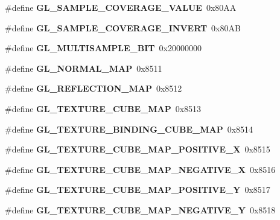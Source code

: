 \begin{DoxyCompactItemize}
\item 
\#define {\bfseries G\+L\+\_\+\+S\+A\+M\+P\+L\+E\+\_\+\+C\+O\+V\+E\+R\+A\+G\+E\+\_\+\+V\+A\+L\+U\+E}~0x80\+A\+A\label{_s_d_l__opengl_8h_a0ec2d62f355f2dc750d1977345938b33}

\item 
\#define {\bfseries G\+L\+\_\+\+S\+A\+M\+P\+L\+E\+\_\+\+C\+O\+V\+E\+R\+A\+G\+E\+\_\+\+I\+N\+V\+E\+R\+T}~0x80\+A\+B\label{_s_d_l__opengl_8h_a493a344af6533267a8be2b58a23130fa}

\item 
\#define {\bfseries G\+L\+\_\+\+M\+U\+L\+T\+I\+S\+A\+M\+P\+L\+E\+\_\+\+B\+I\+T}~0x20000000\label{_s_d_l__opengl_8h_a0b551148113ae3e7f81e5e9276be21ff}

\item 
\#define {\bfseries G\+L\+\_\+\+N\+O\+R\+M\+A\+L\+\_\+\+M\+A\+P}~0x8511\label{_s_d_l__opengl_8h_ac85ab960342ae6bd06881aabf31899d5}

\item 
\#define {\bfseries G\+L\+\_\+\+R\+E\+F\+L\+E\+C\+T\+I\+O\+N\+\_\+\+M\+A\+P}~0x8512\label{_s_d_l__opengl_8h_a26f8fe65ab3dc613b54b38220c54ac5e}

\item 
\#define {\bfseries G\+L\+\_\+\+T\+E\+X\+T\+U\+R\+E\+\_\+\+C\+U\+B\+E\+\_\+\+M\+A\+P}~0x8513\label{_s_d_l__opengl_8h_a26e189fe84285eb8fae26721662dbe8c}

\item 
\#define {\bfseries G\+L\+\_\+\+T\+E\+X\+T\+U\+R\+E\+\_\+\+B\+I\+N\+D\+I\+N\+G\+\_\+\+C\+U\+B\+E\+\_\+\+M\+A\+P}~0x8514\label{_s_d_l__opengl_8h_ab7d35cf593b0af570c79a6a9a8d2c479}

\item 
\#define {\bfseries G\+L\+\_\+\+T\+E\+X\+T\+U\+R\+E\+\_\+\+C\+U\+B\+E\+\_\+\+M\+A\+P\+\_\+\+P\+O\+S\+I\+T\+I\+V\+E\+\_\+\+X}~0x8515\label{_s_d_l__opengl_8h_ab83eb56dce8e1f7900585d35016abf39}

\item 
\#define {\bfseries G\+L\+\_\+\+T\+E\+X\+T\+U\+R\+E\+\_\+\+C\+U\+B\+E\+\_\+\+M\+A\+P\+\_\+\+N\+E\+G\+A\+T\+I\+V\+E\+\_\+\+X}~0x8516\label{_s_d_l__opengl_8h_ae642ad8e3baa2512e2e27be2cf17373d}

\item 
\#define {\bfseries G\+L\+\_\+\+T\+E\+X\+T\+U\+R\+E\+\_\+\+C\+U\+B\+E\+\_\+\+M\+A\+P\+\_\+\+P\+O\+S\+I\+T\+I\+V\+E\+\_\+\+Y}~0x8517\label{_s_d_l__opengl_8h_a0605d5ef41613665b34391f9ba398997}

\item 
\#define {\bfseries G\+L\+\_\+\+T\+E\+X\+T\+U\+R\+E\+\_\+\+C\+U\+B\+E\+\_\+\+M\+A\+P\+\_\+\+N\+E\+G\+A\+T\+I\+V\+E\+\_\+\+Y}~0x8518\label{_s_d_l__opengl_8h_a8d31f977b3490eb05832ecc261313462}


\end{DoxyCompactItemize}
